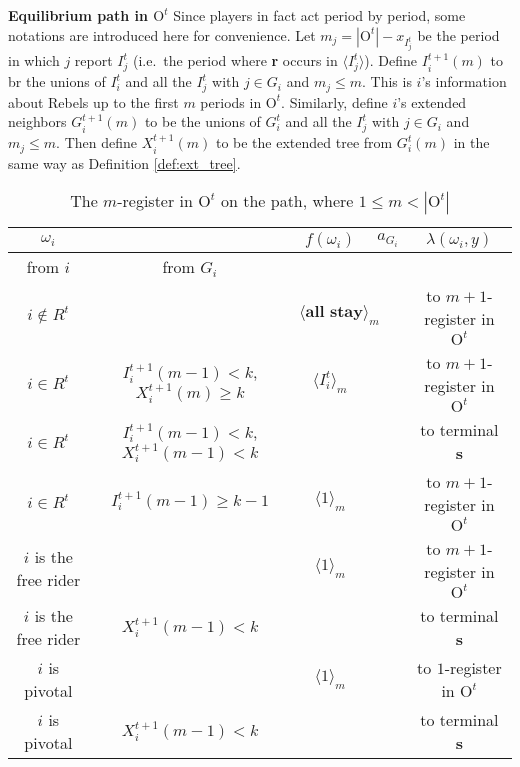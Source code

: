 \documentclass[12pt,letter]{article}
\newcommand{\Omicron}{\mathrm{O}}
\theoremstyle{definition}
\theoremstyle{remark}
\theoremstyle{claim}
\begin{document}
\noindent \textbf{Equilibrium path in $\Omicron^t$}
Since players in fact act period by period, some notations are introduced here for convenience. Let $m_j=|\Omicron^t|-x_{I^t_j}$ be the period in which $j$ report $I^t_j$ (i.e.~the period where \textbf{r} occurs in $\langle I^t_j \rangle$). Define $I^{t+1}_i(m)$ to br the unions of $I^t_i$ and all the $I^t_j$ with $j\in G_i$ and $m_j\leq m$. This is $i$'s information about Rebels up to the first $m$ periods in $\Omicron^t$. Similarly, define $i$'s extended neighbors $G^{t+1}_i(m)$ to be the unions of $G^t_i$ and all the $I^t_j$ with $j\in G_i$ and $m_j\leq m$. Then define $X^{t+1}_i(m)$ to be the extended tree from $G^t_i(m)$ in the same way as Definition \ref{def:ext_tree}.
\begin{table}[!htbp]
\caption{The $m$-register in $\Omicron^t$ on the path, where $1\leq m<|\Omicron^t|$}
\begin{center}
\begin{tabular}{c c | c | c | c}
$\omega_i$ 	 & 	   &	$f(\omega_i)$  &	$a_{G_i}$ & $\lambda(\omega_i,y)$ \\
\hline
\hline
from $i$ 	 & from $G_i$	  & 	&	 & \\
\hline
$i\notin R^t$  	& 								& $\langle \textbf{all stay} \rangle_m$		&  			& to $m+1$-register in $\Omicron^t$ \\
$i\in R^t$  	& $I^{t+1}_i(m-1)<k$, $X^{t+1}_i(m)\geq k$		    & $\langle I^t_i \rangle_m$ 		&    			& to $m+1$-register in $\Omicron^t$ \\
$i\in R^t$	 	&  $I^{t+1}_i(m-1)< k$, $X^{t+1}_i(m-1)<k$			&  	& 									  & to terminal \textbf{s} \\
$i\in R^t$	 	&  $I^{t+1}_i(m-1)\geq k-1$			& $\langle 1 \rangle_m$ 	& 									  & to $m+1$-register in $\Omicron^t$ \\
$i$ is the free rider  	&  			& $\langle 1 \rangle_m$ 		& 				  & to $m+1$-register in $\Omicron^t$ \\
$i$ is the free rider  	&  		$X^{t+1}_i(m-1)<k$					&  		& 										  & to terminal \textbf{s} \\
$i$ is pivotal  	&  					& $\langle 1 \rangle_m$ 	& 											 & to $1$-register in $\Omicron^t$ \\
$i$ is pivotal  	&  	$X^{t+1}_i(m-1)<k$		&  	& 											 & to terminal \textbf{s} \\
\hline
\end{tabular}
\end{center}
\end{table}
\end{document}
